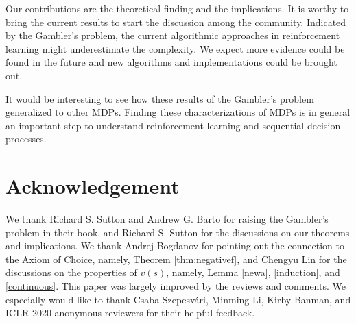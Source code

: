 \documentclass{article}
\theoremstyle{named}
\begin{document}
Our contributions are the theoretical finding and the implications. It is worthy to bring the current results to start the discussion among the community. Indicated by the Gambler's problem, the current algorithmic approaches in reinforcement learning might underestimate the complexity. We expect more evidence could be found in the future and new algorithms and implementations could be brought out.

It would be interesting to see how these results of the Gambler's problem generalized to other MDPs. Finding these characterizations of MDPs is in general an important step to understand reinforcement learning and sequential decision processes.

\newpage

\section*{Acknowledgement}

We thank Richard S. Sutton and Andrew G. Barto for raising the Gambler's problem in their book, and Richard S. Sutton for the discussions on our theorems and implications. We thank Andrej Bogdanov for pointing out the connection to the Axiom of Choice, namely, Theorem \ref{thm:negativef}, and Chengyu Lin for the discussions on the properties of $v(s)$, namely, Lemma \ref{newa}, \ref{induction}, and \ref{continuous}. This paper was largely improved by the reviews and comments. We especially would like to thank Csaba Szepesvári, Minming Li, Kirby Banman, and ICLR 2020 anonymous reviewers for their helpful feedback.



\end{document}

